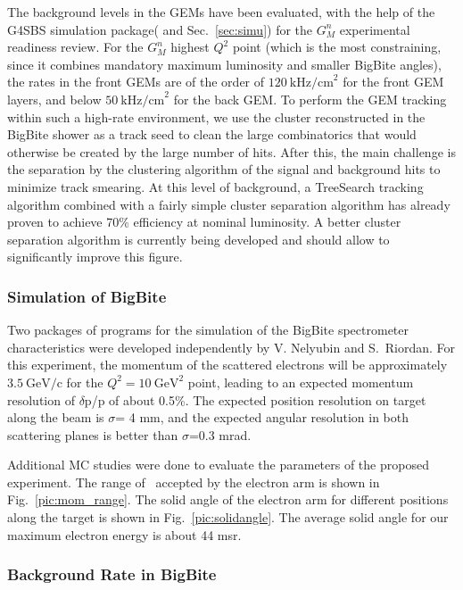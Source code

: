 The background levels in the GEMs have been evaluated, with the help of the G4SBS simulation package(\cite{g4sbs} and Sec.~\ref{sec:simu}) for the $G_M^n$ experimental readiness review. %
For the $G_M^n$ highest $Q^2$ point (which is the most constraining, since it combines mandatory maximum luminosity and smaller BigBite angles), the rates in the front GEMs are of the order of $120~\mathrm{kHz/cm}^2$ for the front GEM layers, and below $50~\mathrm{kHz/cm}^2$ for the back GEM.
To perform the GEM tracking within such a high-rate environment, we use the cluster reconstructed in the BigBite shower as a track seed to clean the large combinatorics that would otherwise be created by the large number of hits. After this, the main challenge is the separation by the clustering algorithm of the signal and background hits to minimize track smearing.
At this level of background, a TreeSearch tracking algorithm combined with a fairly simple cluster separation algorithm has already proven to achieve 70\% efficiency at nominal luminosity.
A better cluster separation algorithm is currently being developed and should allow to significantly improve this figure. 

\iffalse
\subsubsection{Simulation of BigBite}

Two packages of programs for the simulation of the BigBite spectrometer characteristics
were developed independently by V. Nelyubin \cite{nel01} and S.~Riordan.  
For this experiment, the momentum of the scattered electrons will be approximately $\mathrm{3.5~\mathrm{GeV/c}}$ for the $Q^2 = 10~\mathrm{GeV}^2$ point, 
leading to an expected momentum resolution of $\delta$p/p  of about 0.5\%.  
The expected position resolution on target
along the beam is $\sigma$= 4 mm, and the expected angular resolution in both 
scattering planes is better than $\sigma$=0.3 mrad.  

Additional MC studies were done to evaluate the parameters of the proposed experiment.  
The range of \qsq~accepted by the electron arm is shown in Fig.~\ref{pic:mom_range}. 
The solid angle of the electron arm for different positions along the target is shown in Fig.~\ref{pic:solidangle}.  
The average solid angle for our maximum electron energy is about 44 msr.
%

\subsubsection{Background Rate in BigBite}

